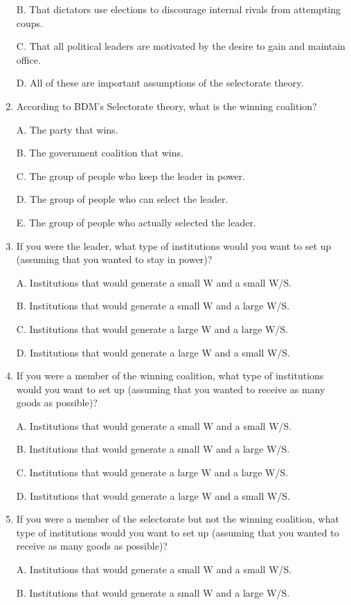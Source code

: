 \documentclass[
]{book}
\begin{document}
\begin{enumerate}
  B. That dictators use elections to discourage internal rivals from attempting coups.

  C. That all political leaders are motivated by the desire to gain and maintain office.

  D. All of these are important assumptions of the selectorate theory.
\item
  According to BDM's Selectorate theory, what is the winning coalition?

  A. The party that wins.

  B. The government coalition that wins.

  C. The group of people who keep the leader in power.

  D. The group of people who can select the leader.

  E. The group of people who actually selected the leader.
\item
  If you were the leader, what type of institutions would you want to set up (assuming that you wanted to stay in power)?

  A. Institutions that would generate a small W and a small W/S.

  B. Institutions that would generate a small W and a large W/S.

  C. Institutions that would generate a large W and a large W/S.

  D. Institutions that would generate a large W and a small W/S.
\item
  If you were a member of the winning coalition, what type of institutions would you want to set up (assuming that you wanted to receive as many goods as possible)?

  A. Institutions that would generate a small W and a small W/S.

  B. Institutions that would generate a small W and a large W/S.

  C. Institutions that would generate a large W and a large W/S.

  D. Institutions that would generate a large W and a small W/S.
\item
  If you were a member of the selectorate but not the winning coalition, what type of institutions would you want to set up (assuming that you wanted to receive as many goods as possible)?

  A. Institutions that would generate a small W and a small W/S.

  B. Institutions that would generate a small W and a large W/S.


\end{enumerate}
\end{document}
